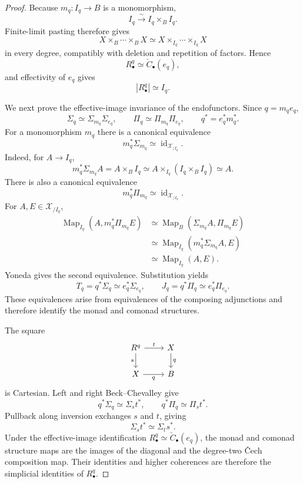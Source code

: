 \begin{proof}
Because $m_q:I_q\to B$ is a monomorphism,
\[
    I_q\xrightarrow{\sim}I_q\times_BI_q.
\]
Finite-limit pasting therefore gives
\[
    X\times_B\cdots\times_BX
    \simeq
    X\times_{I_q}\cdots\times_{I_q}X
\]
in every degree, compatibly with deletion and repetition of factors.  Hence
\[
    R^q_\bullet\simeq\check C_\bullet(e_q),
\]
and effectivity of $e_q$ gives
\[
    |R^q_\bullet|\simeq I_q.
\]

We next prove the effective-image invariance of the endofunctors.  Since
$q=m_qe_q$,
\[
    \Sigma_q\simeq\Sigma_{m_q}\Sigma_{e_q},
    \qquad
    \Pi_q\simeq\Pi_{m_q}\Pi_{e_q},
    \qquad
    q^*=e_q^*m_q^*.
\]
For a monomorphism $m_q$ there is a canonical equivalence
\[
    m_q^*\Sigma_{m_q}\simeq\operatorname{id}_{\mathcal X_{/I_q}}.
\]
Indeed, for $A\to I_q$,
\[
    m_q^*\Sigma_{m_q}A
    =
    A\times_BI_q
    \simeq
    A\times_{I_q}(I_q\times_BI_q)
    \simeq A.
\]
There is also a canonical equivalence
\[
    m_q^*\Pi_{m_q}\simeq\operatorname{id}_{\mathcal X_{/I_q}}.
\]
For $A,E\in\mathcal X_{/I_q}$,
\[
\begin{aligned}
    \operatorname{Map}_{I_q}(A,m_q^*\Pi_{m_q}E)
    &\simeq
    \operatorname{Map}_{B}(\Sigma_{m_q}A,\Pi_{m_q}E)\\
    &\simeq
    \operatorname{Map}_{I_q}(m_q^*\Sigma_{m_q}A,E)\\
    &\simeq
    \operatorname{Map}_{I_q}(A,E).
\end{aligned}
\]
Yoneda gives the second equivalence.  Substitution yields
\[
    T_q=q^*\Sigma_q
    \simeq
    e_q^*\Sigma_{e_q},
    \qquad
    J_q=q^*\Pi_q
    \simeq
    e_q^*\Pi_{e_q}.
\]
These equivalences arise from equivalences of the composing adjunctions and
therefore identify the monad and comonad structures.

The square
\[
\begin{tikzcd}
R^q \arrow[r,"t"] \arrow[d,"s"'] & X \arrow[d,"q"]\\
X \arrow[r,"q"'] & B
\end{tikzcd}
\]
is Cartesian.  Left and right Beck--Chevalley give
\[
    q^*\Sigma_q\simeq\Sigma_s t^*,
    \qquad
    q^*\Pi_q\simeq\Pi_s t^*.
\]
Pullback along inversion exchanges $s$ and $t$, giving
\[
    \Sigma_s t^*\simeq\Sigma_t s^*.
\]
Under the effective-image identification
$R^q_\bullet\simeq\check C_\bullet(e_q)$, the monad and comonad structure
maps are the images of the diagonal and the degree-two \v{C}ech composition
map.  Their identities and higher coherences are therefore the simplicial
identities of $R^q_\bullet$.


\end{proof}
